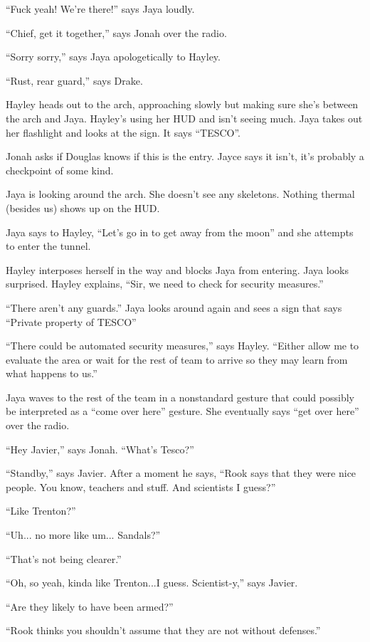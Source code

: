 ``Fuck yeah!  We're there!'' says Jaya loudly.

``Chief, get it together,'' says Jonah over the radio.

``Sorry sorry,'' says Jaya apologetically to Hayley.

``Rust, rear guard,'' says Drake.

Hayley heads out to the arch, approaching slowly but making sure she's between the arch and Jaya.  Hayley's using her HUD and isn't seeing much.  Jaya takes out her flashlight and looks at the sign.  It says ``TESCO''.  

Jonah asks if Douglas knows if this is the entry.   Jayce says it isn't, it's probably a checkpoint of some kind.  

Jaya is looking around the arch.  She doesn't see any skeletons.  Nothing thermal (besides us) shows up on the HUD.

Jaya says to Hayley, ``Let's go in to get away from the moon'' and she attempts to enter the tunnel.

Hayley interposes herself in the way and blocks Jaya from entering.  Jaya looks surprised.  Hayley explains, ``Sir, we need to check for security measures.''

``There aren't any guards.''  Jaya looks around again and sees a sign that says ``Private property of TESCO''

``There could be automated security measures,'' says Hayley.  ``Either allow me to evaluate the area or wait for the rest of team to arrive so they may learn from what happens to us.''

Jaya waves to the rest of the team in a nonstandard gesture that could possibly be interpreted as a ``come over here'' gesture.  She eventually says ``get over here'' over the radio.

``Hey Javier,'' says Jonah.  ``What's Tesco?''

``Standby,'' says Javier.  After a moment he says, ``Rook says that they were nice people.  You know, teachers and stuff.  And scientists I guess?''

``Like Trenton?''

``Uh... no more like um... Sandals?''

``That's not being clearer.''

``Oh, so yeah, kinda like Trenton...I guess.  Scientist-y,'' says Javier.

``Are they likely to have been armed?''

``Rook thinks you shouldn't assume that they are not without defenses.''

